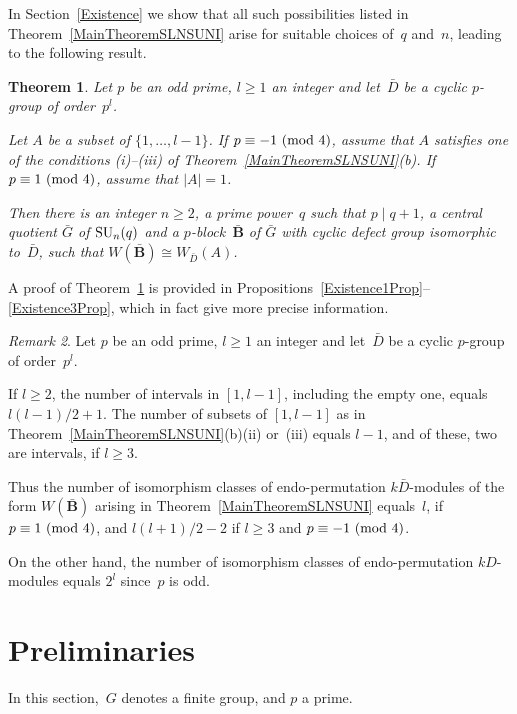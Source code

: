 \documentclass[12pt]{amsart}
\newcommand{\bB}{{\mathbf{B}}}
\def\SU{ \text{\rm SU} }
\newtheorem{thm}{Theorem}[section]
\theoremstyle{theorem}
\theoremstyle{definition}
\theoremstyle{remark}
\newtheorem{rem}[thm]{Remark}
\begin{document}
In Section~\ref{Existence} we show that all such possibilities listed in
Theorem~\ref{MainTheoremSLNSUNI} arise for suitable choices of~$q$ and~$n$, 
leading to the following result.

\begin{thm}
\label{MainTheoremSLNSUNII} 
Let $p$ be an odd prime, $l \geq 1$ an integer and let~$\bar{D}$ be a cyclic 
$p$-group of order~$p^{l}$. 

Let $A$ be a subset of $\{ 1, \ldots , l - 1 \}$.  
If $p \equiv -1\,\,(\mbox{\rm mod}\,\,4)$, assume that $A$ satisfies one of the 
conditions {\rm (i)--(iii)} of {\rm Theorem~\ref{MainTheoremSLNSUNI}(b)}. If 
$p \equiv 1\,\,(\mbox{\rm mod}\,\,4)$, assume that $|A| = 1$.

Then there is an integer $n \geq 2$, a prime power~$q$ such that
$p \mid q + 1$, a central quotient $\bar{G}$ of $\SU_n( q )$ and a
$p$-block~$\bar{\bB}$ of $\bar{G}$ with cyclic defect group isomorphic
to~$\bar{D}$, such that $W( \bar{\bB} ) \cong W_{\bar{D}}( A )$. \hfill{\textsquare}
\end{thm} 

A proof of Theorem~\ref{MainTheoremSLNSUNII} is provided in
Propositions~\ref{Existence1Prop}--\ref{Existence3Prop}, which in fact give 
more precise information.

\begin{rem}
{\rm 
Let $p$ be an odd prime, $l \geq 1$ an integer and let~$\bar{D}$ be a cyclic 
$p$-group of order~$p^{l}$. 

If $l \geq 2$, the number of intervals in $[1, l - 1]$, including the empty one, 
equals $l(l - 1)/2 + 1$. The number of subsets of $[1, l - 1]$ as in 
Theorem~\ref{MainTheoremSLNSUNI}(b)(ii) or~(iii) equals $l - 1$, and of these, 
two are intervals, if $l \geq 3$.

Thus the number of isomorphism classes of endo-permutation $k\bar{D}$-modules of 
the form $W( \bar{\bB} )$ arising in Theorem~\ref{MainTheoremSLNSUNI} 
equals~$l$, if $p \equiv 1\,\,(\mbox{\rm mod}\,\,4)$, and $l(l+1)/2 - 2$ if 
$l \geq 3$ and $p \equiv -1\,\,(\mbox{\rm mod}\,\,4)$.

On the other hand, the number of isomorphism classes of endo-permutation 
$kD$-modules equals $2^l$ since~$p$ is odd. 
}\hfill{\textsquare}
\end{rem}

\section{Preliminaries}
\label{MinimalGeneratingSets}
In this section,~$G$ denotes a finite group, and $p$ a prime.
\end{document}
